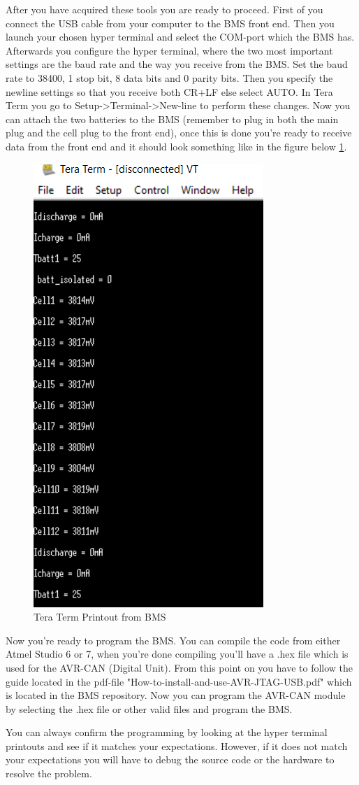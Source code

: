 After you have acquired these tools you are ready to proceed. First of you connect the USB cable from your computer to the BMS front end. Then you launch your chosen hyper terminal and select the COM-port which the BMS has. Afterwards you configure the hyper terminal, where the two most important settings are the baud rate and the way you receive from the BMS. Set the baud rate to 38400, 1 stop bit, 8 data bits and 0 parity bits. Then you specify the newline settings so that you receive both CR+LF else select AUTO. In Tera Term you go to Setup->Terminal->New-line to perform these changes. 
Now you can attach the two batteries to the BMS (remember to plug in both the main plug and the cell plug to the front end), once this is done you're ready to receive data from the front end and it should look something like in the figure below \ref{fig:BMSTeraTerm}.
\begin{figure}[H]
	\centering
	\includegraphics[width=0.6\linewidth]{Hardware/Pictures/BMS_teraterm}
	\caption{Tera Term Printout from BMS}
	\label{fig:BMSTeraTerm}
\end{figure}

Now you're ready to program the BMS. You can compile the code from either Atmel Studio 6 or 7, when you're done compiling you'll have a .hex file which is used for the AVR-CAN (Digital Unit). From this point on you have to follow the guide located in the pdf-file "How-to-install-and-use-AVR-JTAG-USB.pdf" which is located in the BMS repository. Now you can program the AVR-CAN module by selecting the .hex file or other valid files and program the BMS.

You can always confirm the programming by looking at the hyper terminal printouts and see if it matches your expectations. However, if it does not match your expectations you will have to debug the source code or the hardware to resolve the problem.

